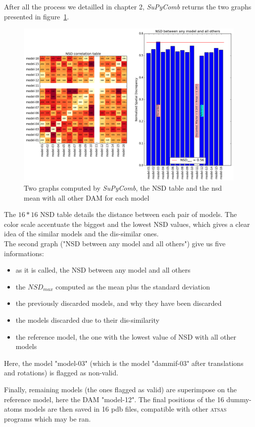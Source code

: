 \documentclass[a4paper, 11pt]{report}
\begin{document}
After all the process we detailled in chapter 2, \textit{SuPyComb} 
returns the two graphs presented in figure~\ref{fgr:nsd}. 
\begin{figure}
\centering
\includegraphics[scale=0.45]{nsd.png}
\caption{Two graphs computed by \textit{SuPyComb}, the NSD table and 
         the nsd mean with all other DAM for each model}
\label{fgr:nsd}
\end{figure}
The $16*16$ NSD table details the distance between each pair of 
models. 
The color scale accentuate the biggest and the lowest NSD values, 
which gives a clear idea of the similar models and the dis-similar 
ones.\\
The second graph ("NSD between any model and all others") give us 
five informations:
\begin{itemize}
\item as it is called, the NSD between any model and all others
\item the $NSD_{max}$ computed as the mean plus the standard deviation
\item the previously discarded models, and why they have been discarded
\item the models discarded due to their dis-similarity
\item the reference model, the one with the lowest value of NSD with 
      all other models
\end{itemize}
Here, the model "model-03" (which is the model "dammif-03" after 
translations and rotations) is flagged as non-valid.

Finally, remaining models (the ones flagged as valid) are superimpose 
on the reference model, here the DAM "model-12". 
The final positions of the 16 dummy-atoms models are then saved in 16 
pdb files, compatible with other \textsc{atsas} programs which may be 
ran.
\end{document}
